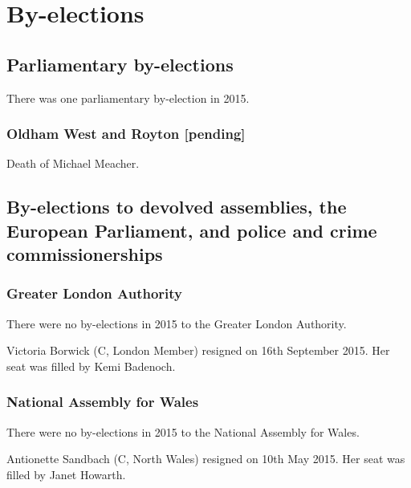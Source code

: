\documentclass[a4paper,openany]{book}
\begin{document}
 
 



\part{By-elections}

\chapter{Parliamentary by-elections}

There was one parliamentary by-election in 2015.

\section*{Oldham West and Royton \hspace*{\fill}\nolinebreak[1]%
\enspace\hspace*{\fill}
[pending]}


Death of Michael Meacher.

\chapter{By-elections to devolved assemblies, the European Parliament, and police and crime commissionerships}

\section{Greater London Authority}

There were no by-elections in 2015 to the Greater London Authority.

Victoria Borwick (C, London Member) resigned on 16th September 2015.  Her seat was filled by Kemi Badenoch.

\section{National Assembly for Wales}

There were no by-elections in 2015 to the National Assembly for Wales.

Antionette Sandbach (C, North Wales) resigned on 10th May 2015.  Her seat was filled by Janet Howarth.
\end{document}

